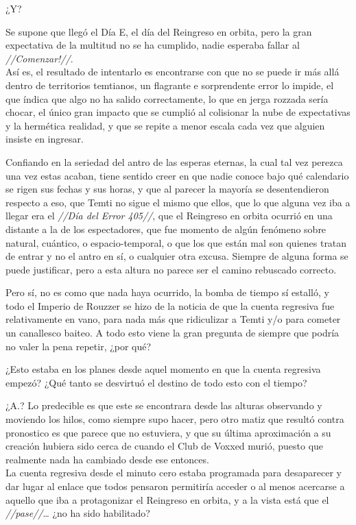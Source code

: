 \documentclass[
  spanish,
]{book}
\begin{document}
¿Y?

Se supone que llegó el Día E, el día del Reingreso en orbita, pero la gran expectativa de la multitud no se ha cumplido, nadie esperaba fallar al \emph{//Comenzar!//}.\\
Así es, el resultado de intentarlo es encontrarse con que no se puede ir más allá dentro de territorios temtianos, un flagrante e sorprendente error lo impide, el que índica que algo no ha salido correctamente, lo que en jerga rozzada sería chocar, el único gran impacto que se cumplió al colisionar la nube de expectativas y la hermética realidad, y que se repite a menor escala cada vez que alguien insiste en ingresar.

Confiando en la seriedad del antro de las esperas eternas, la cual tal vez perezca una vez estas acaban, tiene sentido creer en que nadie conoce bajo qué calendario se rigen sus fechas y sus horas, y que al parecer la mayoría se desentendieron respecto a eso, que Temti no sigue el mismo que ellos, que lo que alguna vez iba a llegar era el \emph{//Día del Error 405//}, que el Reingreso en orbita ocurrió en una distante a la de los espectadores, que fue momento de algún fenómeno sobre natural, cuántico, o espacio-temporal, o que los que están mal son quienes tratan de entrar y no el antro en sí, o cualquier otra excusa. Siempre de alguna forma se puede justificar, pero a esta altura no parece ser el camino rebuscado correcto.

Pero sí, no es como que nada haya ocurrido, la bomba de tiempo sí estalló, y todo el Imperio de Rouzzer se hizo de la noticia de que la cuenta regresiva fue relativamente en vano, para nada más que ridiculizar a Temti y/o para cometer un canallesco baiteo. A todo esto viene la gran pregunta de siempre que podría no valer la pena repetir, ¿por qué?

¿Esto estaba en los planes desde aquel momento en que la cuenta regresiva empezó? ¿Qué tanto se desvirtuó el destino de todo esto con el tiempo?

¿A.? Lo predecible es que este se encontrara desde las alturas observando y moviendo los hilos, como siempre supo hacer, pero otro matiz que resultó contra pronostico es que parece que no estuviera, y que su última aproximación a su creación hubiera sido cerca de cuando el Club de Voxxed murió, puesto que realmente nada ha cambiado desde ese entonces.\\
La cuenta regresiva desde el minuto cero estaba programada para desaparecer y dar lugar al enlace que todos pensaron permitiría acceder o al menos acercarse a aquello que iba a protagonizar el Reingreso en orbita, y a la vista está que el \emph{//pase//}\ldots{} ¿no ha sido habilitado?
\end{document}
